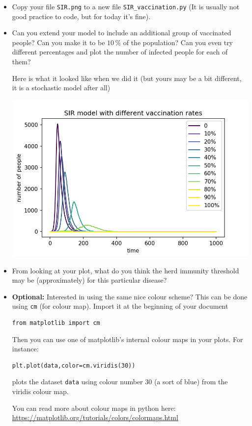 \documentclass[pdflatex,a4paper]{article}
\begin{document}
\begin{itemize}
\item
Copy your file \verb=SIR.png= to a new file \verb=SIR_vaccination.py= (It is usually not good practice to code, but for today it's fine).
\item
Can you extend your model to include an additional group of vaccinated people? Can you make it to be \(10\,\%\) of the population? Can you even try different percentages and plot the number of infected people for each of them? 

Here is what it looked like when we did it (but yours may be a bit different, it is a stochastic model after all)

\includegraphics{SIR_vaccine.png}

\item

From looking at your plot, what do you think the herd immunity threshold may be (approximately) for this particular disease?

\newpage

\item
\textbf{Optional:} Interested in using the same nice colour scheme? This can be done using \verb=cm= (for colour map). Import it at the beginning of your document

\begin{lstlisting}
from matplotlib import cm
\end{lstlisting}

Then you can use one of matplotlib's internal colour maps in your plots. For instance:

\begin{lstlisting}
plt.plot(data,color=cm.viridis(30))
\end{lstlisting}

plots the dataset \verb=data= using colour number 30 (a sort of blue) from the viridis colour map. 

You can read more about colour maps in python here: \url{https://matplotlib.org/tutorials/colors/colormaps.html}

\end{itemize}
\end{document}

